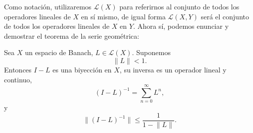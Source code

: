 Como notación, utilizaremos $\mathcal{L}(X)$ para referirnos al conjunto de todos los operadores lineales de $X$ en sí mismo, de igual forma $\mathcal{L}(X,Y)$ será el conjunto de todos los operadores lineales de $X$ en $Y$. Ahora sí, podemos enunciar y demostrar el teorema de la serie geométrica:
\begin{teorema}
	Sea $X$ un espacio de Banach, $L \in \mathcal{L}(X)$. Suponemos
	\begin{equation}
		\lVert L \rVert < 1.
	\end{equation}
	Entonces $I - L$ es una biyección en $X$, su inversa es un operador lineal y continuo,
	\begin{equation}
		(I-L)^{-1} = \sum_{n=0}^{\infty}L^n,
	\end{equation}
	y
	\begin{equation}\label{eq:teo1}
		\lVert (I-L)^{-1} \rVert \leqslant \dfrac{1}{1 - \lVert L \rVert}.
	\end{equation}
\end{teorema}
